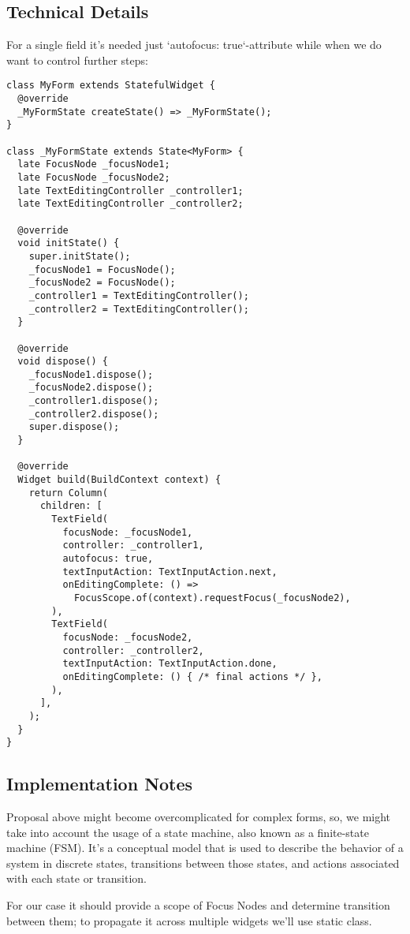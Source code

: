 \subsection{Technical Details}

For a single field it's needed just `autofocus: true`-attribute while when we do want to control further steps:

\begin{lstlisting}
class MyForm extends StatefulWidget {
  @override
  _MyFormState createState() => _MyFormState();
}

class _MyFormState extends State<MyForm> {
  late FocusNode _focusNode1;
  late FocusNode _focusNode2;
  late TextEditingController _controller1;
  late TextEditingController _controller2;

  @override
  void initState() {
    super.initState();
    _focusNode1 = FocusNode();
    _focusNode2 = FocusNode();
    _controller1 = TextEditingController();
    _controller2 = TextEditingController();
  }

  @override
  void dispose() {
    _focusNode1.dispose();
    _focusNode2.dispose();
    _controller1.dispose();
    _controller2.dispose();
    super.dispose();
  }

  @override
  Widget build(BuildContext context) {
    return Column(
      children: [
        TextField(
          focusNode: _focusNode1,
          controller: _controller1,
          autofocus: true,
          textInputAction: TextInputAction.next,
          onEditingComplete: () =>
            FocusScope.of(context).requestFocus(_focusNode2),
        ),
        TextField(
          focusNode: _focusNode2,
          controller: _controller2,
          textInputAction: TextInputAction.done,
          onEditingComplete: () { /* final actions */ },
        ),
      ],
    );
  }
}
\end{lstlisting}

\subsection{Implementation Notes}

Proposal above might become overcomplicated for complex forms, so, we might take into account the usage of a state 
machine, also known as a finite-state machine (FSM). It's a conceptual model that is used to describe the behavior of a 
system in discrete states, transitions between those states, and actions associated with each state or transition.

For our case it should provide a scope of Focus Nodes and determine transition between them; to propagate it across
multiple widgets we'll use static class.

